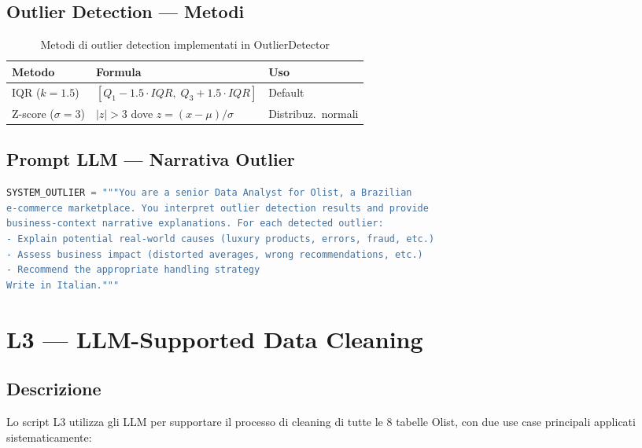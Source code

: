 \documentclass[12pt,a4paper]{article}
\begin{document}
\subsection{Outlier Detection — Metodi}

\begin{table}[H]
  \centering
  \begin{tabular}{lll}
    \toprule
    \textbf{Metodo} & \textbf{Formula} & \textbf{Uso} \\
    \midrule
    IQR ($k=1.5$) & $[Q_1 - 1.5 \cdot IQR,\; Q_3 + 1.5 \cdot IQR]$ & Default \\
    Z-score ($\sigma=3$) & $|z| > 3$ dove $z = (x - \mu)/\sigma$ & Distribuz.\ normali \\
    \bottomrule
  \end{tabular}
  \caption{Metodi di outlier detection implementati in OutlierDetector}
\end{table}

\subsection{Prompt LLM — Narrativa Outlier}

\begin{lstlisting}[language=Python, caption=System prompt per narrativa outlier]
SYSTEM_OUTLIER = """You are a senior Data Analyst for Olist, a Brazilian
e-commerce marketplace. You interpret outlier detection results and provide
business-context narrative explanations. For each detected outlier:
- Explain potential real-world causes (luxury products, errors, fraud, etc.)
- Assess business impact (distorted averages, wrong recommendations, etc.)
- Recommend the appropriate handling strategy
Write in Italian."""
\end{lstlisting}

\section{L3 — LLM-Supported Data Cleaning}

\subsection{Descrizione}

Lo script L3 utilizza gli LLM per supportare il processo di cleaning di
tutte le 8 tabelle Olist, con due use case principali applicati sistematicamente:
\end{document}

